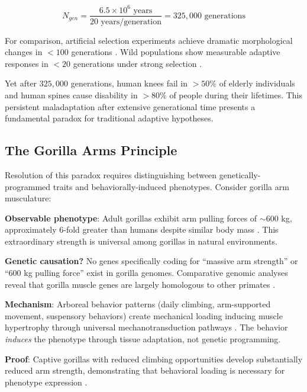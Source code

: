 \begin{equation}
N_{gen} = \frac{6.5 \times 10^6 \text{ years}}{20 \text{ years/generation}} = 325,000 \text{ generations}
\end{equation}

For comparison, artificial selection experiments achieve dramatic morphological changes in $<100$ generations \citep{weber1996phenotypic}. Wild populations show measurable adaptive responses in $<20$ generations under strong selection \citep{reznick1997independent}.

Yet after $325,000$ generations, human knees fail in $>50\%$ of elderly individuals and human spines cause disability in $>80\%$ of people during their lifetimes. This persistent maladaptation after extensive generational time presents a fundamental paradox for traditional adaptive hypotheses.

\subsection{The Gorilla Arms Principle}

Resolution of this paradox requires distinguishing between genetically-programmed traits and behaviorally-induced phenotypes. Consider gorilla arm musculature:

\textbf{Observable phenotype}: Adult gorillas exhibit arm pulling forces of $\sim$600 kg, approximately 6-fold greater than humans despite similar body mass \citep{schoenemann2006brain}. This extraordinary strength is universal among gorillas in natural environments.

\textbf{Genetic causation?} No genes specifically coding for ``massive arm strength'' or ``600 kg pulling force'' exist in gorilla genomes. Comparative genomic analyses reveal that gorilla muscle genes are largely homologous to other primates \citep{scally2012insights}.

\textbf{Mechanism}: Arboreal behavior patterns (daily climbing, arm-supported movement, suspensory behaviors) create mechanical loading inducing muscle hypertrophy through universal mechanotransduction pathways \citep{visscher2008assumption}. The behavior \textit{induces} the phenotype through tissue adaptation, not genetic programming.

\textbf{Proof}: Captive gorillas with reduced climbing opportunities develop substantially reduced arm strength, demonstrating that behavioral loading is necessary for phenotype expression \citep{myatt2011hindlimb}.

